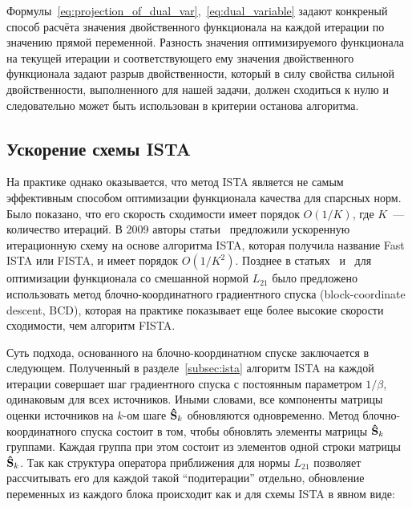 Формулы~\ref{eq:projection_of_dual_var},~\ref{eq:dual_variable} задают
конкреный способ расчёта значения двойственного функционала на каждой итерации
по значению прямой переменной. Разность значения оптимизируемого функционала
на текущей итерации и соответствующего ему значения двойственного функционала
задают разрыв двойственности, который в силу свойства сильной двойственности,
выполненного для нашей задачи, должен сходиться к нулю и следовательно может быть
использован в критерии останова алгоритма.




\subsection{Ускорение схемы ISTA}\label{sec:ista_enhancements}

На практике однако оказывается, что метод
ISTA является не самым эффективным способом оптимизации функционала качества
для спарсных норм. Было показано, что его скорость сходимости имеет порядок
$O(1/K)$, где $K$~--- количество итераций. В 2009 авторы статьи~\cite{Beck2009}
предложили ускоренную итерационную схему на основе
алгоритма ISTA, которая получила название Fast ISTA или FISTA, и имеет порядок
$O(1/K^2)$. Позднее в статьях~\cite{Rakotomamonjy2011} и~\cite{Qin2013} для
оптимизации функционала со смешанной нормой $L_{21}$ было предложено
использовать метод блочно-координатного градиентного спуска (block-coordinate
descent, BCD), которая на практике показывает еще более высокие скорости сходимости,
чем алгоритм FISTA.\@

Суть подхода, основанного на блочно-координатном спуске заключается в следующем.
Полученный в разделе~\ref{subsec:ista} алгоритм ISTA на каждой
итерации совершает шаг градиентного спуска с постоянным параметром $1/\beta$,
одинаковым для всех источников. Иными словами, все компоненты матрицы 
оценки источников на $k$-ом шаге $\mathbf{\hat{S}}_k$ обновляются одновременно.
Метод блочно-координатного спуска состоит в том, чтобы обновлять элементы матрицы $\mathbf{\hat{S}}_k$
группами. Каждая группа при этом состоит из элементов одной строки матрицы $\mathbf{\hat{S}}_k$.
Так как структура оператора приближения для нормы $L_{21}$ позволяет
рассчитывать его для каждой такой ``подитерации'' отдельно, обновление переменных из
каждого блока происходит как и для схемы ISTA в явном виде:

